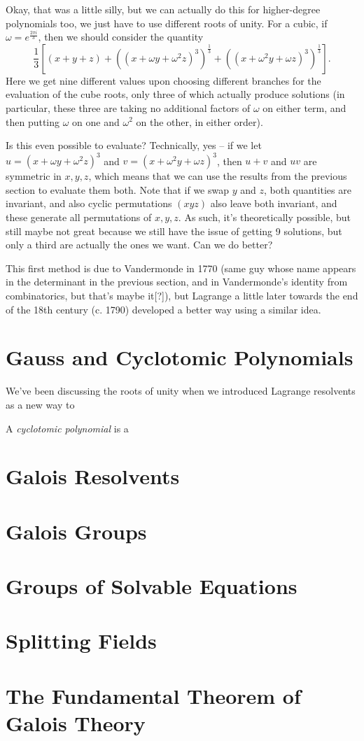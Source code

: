 \documentclass[12pt]{scrartcl}
\begin{document}
Okay, that was a little silly, but we can actually do this for higher-degree polynomials too, we just have to use different roots of unity. For a cubic, if $\omega = e^{\frac{2\pi i}3}$, then we should consider the quantity
\[ \frac 13 [(x + y + z) + ((x + \omega y + \omega^2 z)^3)^{\frac 13} + ((x + \omega^2 y  + \omega z)^3)^{\frac 13}].\]
Here we get nine different values upon choosing different branches for the evaluation of the cube roots, only three of which actually produce solutions (in particular, these three are taking no additional factors of $\omega$ on either term, and then putting $\omega$ on one and $\omega^2$ on the other, in either order).

Is this even possible to evaluate? Technically, yes -- if we let $u = (x + \omega y + \omega^2 z)^3$ and $v = (x + \omega^2 y + \omega z)^3$, then $u+v$ and $uv$ are symmetric in $x, y, z$, which means that we can use the results from the previous section to evaluate them both. Note that if we swap $y$ and $z$, both quantities are invariant, and also cyclic permutations $(x y z)$ also leave both invariant, and these generate all permutations of $x, y, z$. As such, it's theoretically possible, but still maybe not great because we still have the issue of getting 9 solutions, but only a third are actually the ones we want. Can we do better?

This first method is due to Vandermonde in 1770 (same guy whose name appears in the determinant in the previous section, and in Vandermonde's identity from combinatorics, but that's maybe it[?]), but Lagrange a little later towards the end of the 18th century (c. 1790) developed a better way using a similar idea.


\section{Gauss and Cyclotomic Polynomials}
We've been discussing the roots of unity when we introduced Lagrange resolvents as a new way to

A \textit{cyclotomic polynomial} is a

\section{Galois Resolvents}

\section{Galois Groups}

\section{Groups of Solvable Equations}

\section{Splitting Fields}

\section{The Fundamental Theorem of Galois Theory}
\end{document}
